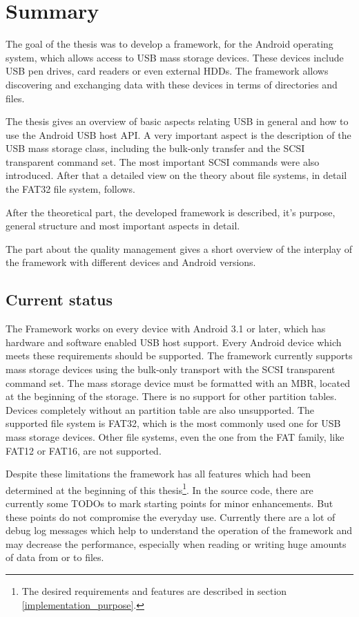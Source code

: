 \chapter{Summary}

The goal of the thesis was to develop a framework, for the Android operating system, which allows access to USB mass storage devices. These devices include USB pen drives, card readers or even external HDDs. The framework allows discovering and exchanging data with these devices in terms of directories and files.

The thesis gives an overview of basic aspects relating USB in general and how to use the Android USB host API. A very important aspect is the description of the USB mass storage class, including the bulk-only transfer and the SCSI transparent command set. The most important SCSI commands were also introduced. After that a detailed view on the theory about file systems, in detail the FAT32 file system, follows.

After the theoretical part, the developed framework is described, it's purpose, general structure and most important aspects in detail.

The part about the quality management gives a short overview of the interplay of the framework with different devices and Android versions.

\section{Current status}

The Framework works on every device with Android 3.1 or later, which has hardware and software enabled USB host support. Every Android device which meets these requirements should be supported. The framework currently supports mass storage devices using the bulk-only transport with the SCSI transparent command set. The mass storage device must be formatted with an MBR, located at the beginning of the storage. There is no support for other partition tables. Devices completely without an partition table are also unsupported. The supported file system is FAT32, which is the most commonly used one for USB mass storage devices. Other file systems, even the one from the FAT family, like FAT12 or FAT16, are not supported.

Despite these limitations the framework has all features which had been determined at the beginning of this thesis\footnote{The desired requirements and features are described in section \ref{implementation_purpose}.}. In the source code, there are currently some TODOs to mark starting points for minor enhancements. But these points do not compromise the everyday use. Currently there are a lot of debug log messages which help to understand the operation of the framework and may decrease the performance, especially when reading or writing huge amounts of data from or to files.

